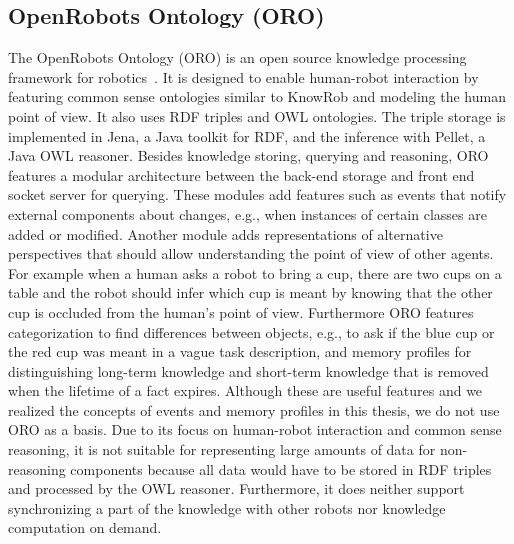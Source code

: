 \subsection{OpenRobots Ontology (ORO)}
\label{sec:oro}
The OpenRobots Ontology (ORO) is an open source knowledge processing
framework for robotics~\cite{Oro}. It is designed to enable
human-robot interaction by featuring common sense ontologies similar to
KnowRob and modeling the human point of view. It also uses RDF triples
and OWL ontologies.  The triple storage is implemented in Jena, a Java
toolkit for RDF, and the inference with Pellet, a Java OWL
reasoner. Besides knowledge storing, querying and reasoning, ORO
features a modular architecture between the back-end storage and front
end socket server for querying. These modules add features such as
events that notify external components about changes, e.g., when
instances of certain classes are added or modified.
Another module adds representations of alternative perspectives that
should allow understanding the point of view of other agents.
For example when a human asks a robot to bring a
cup, there are two cups on a table and the robot should infer which
cup is meant by knowing that the other cup is occluded from the human's
point of view. Furthermore ORO features categorization to find
differences between objects, e.g., to ask if the blue cup or the red
cup was meant in a vague task description, and memory profiles for
distinguishing long-term knowledge and short-term knowledge that is
removed when the lifetime of a fact expires. Although these are useful
features and we realized the concepts of events and memory
profiles in this thesis, we do not use ORO as a basis. Due to its
focus on human-robot interaction and common sense reasoning, it is not
suitable for representing large amounts of data for non-reasoning
components because all data would have to be stored in RDF triples and
processed by the OWL reasoner. Furthermore, it does neither support
synchronizing a part of the knowledge with other robots nor knowledge
computation on demand.

